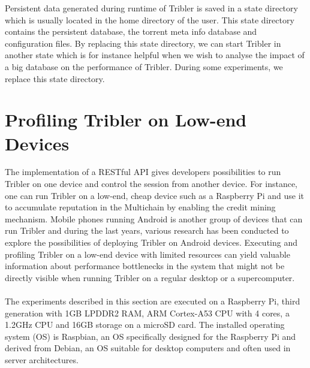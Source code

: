 Persistent data generated during runtime of Tribler is saved in a state directory which is usually located in the home directory of the user. This state directory contains the persistent database, the torrent meta info database and configuration files. By replacing this state directory, we can start Tribler in another state which is for instance helpful when we wish to analyse the impact of a big database on the performance of Tribler. During some experiments, we replace this state directory.

\section{Profiling Tribler on Low-end Devices}
\label{sec:profiling_tribler_lowend}
The implementation of a RESTful API gives developers possibilities to run Tribler on one device and control the session from another device. For instance, one can run Tribler on a low-end, cheap device such as a Raspberry Pi and use it to accumulate reputation in the Multichain by enabling the credit mining mechanism. Mobile phones running Android is another group of devices that can run Tribler and during the last years, various research has been conducted to explore the possibilities of deploying Tribler on Android devices\cite{sabee2014tribler}\cite{de2014android}. Executing and profiling Tribler on a low-end device with limited resources can yield valuable information about performance bottlenecks in the system that might not be directly visible when running Tribler on a regular desktop or a supercomputer.\\\\
The experiments described in this section are executed on a Raspberry Pi, third generation with 1GB LPDDR2 RAM, ARM Cortex-A53 CPU with 4 cores, a 1.2GHz CPU and 16GB storage on a microSD card. The installed operating system (OS) is Raspbian, an OS specifically designed for the Raspberry Pi and derived from Debian, an OS suitable for desktop computers and often used in server architectures.\\\\
